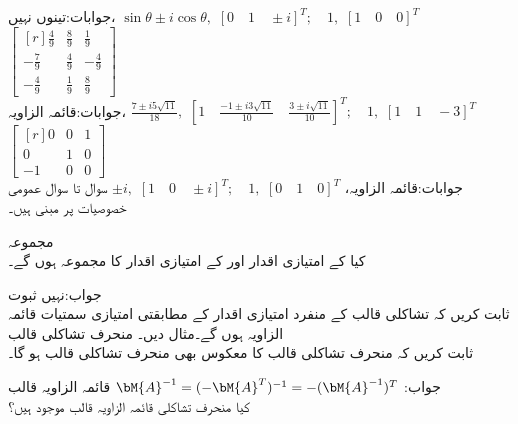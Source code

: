 جوابات:تینوں نہیں، 
$\sin \theta\pm i\cos \theta,\,\,[0\quad 1 \quad \pm i]^T;\quad  1,\,\,[1\quad 0\quad 0]^T$
\quad
$\begin{bmatrix*}[r] \tfrac{4}{9}&\tfrac{8}{9}&\tfrac{1}{9}\\-\tfrac{7}{9}&\tfrac{4}{9}&-\tfrac{4}{9}\\-\tfrac{4}{9}&\tfrac{1}{9}&\tfrac{8}{9} \end{bmatrix*}$\\
جوابات:قائمہ الزاویہ، 
$\tfrac{7\pm i5\sqrt{11}}{18},\,\,[1\quad \tfrac{-1\pm i3\sqrt{11}}{10}\quad \tfrac{3\pm i\sqrt{11}}{10}]^T;\quad  1,\,\,[1\quad 1\quad -3]^T$
\quad
$\begin{bmatrix*}[r] 0&0&1\\0&1&0\\ -1&0&0\end{bmatrix*}$\\
جوابات:قائمہ الزاویہ، 
$\pm i,\,\,[1\quad 0 \quad \pm i]^T;\quad  1,\,\,[0\quad 1\quad 0]^T$
سوال  تا سوال  عمومی خصوصیات پر مبنی ہیں۔

\quad مجموعہ\\
کیا  کے امتیازی اقدار  اور  کے امتیازی اقدار کا مجموعہ ہوں گے۔

جواب:نہیں
\quad ثبوت\\
ثابت کریں کہ تشاکلی قالب کے منفرد امتیازی اقدار کے مطابقتی امتیازی سمتیات قائمہ الزاویہ ہوں گے۔مثال دیں۔
\quad منحرف تشاکلی قالب\\
ثابت کریں کہ منحرف تشاکلی قالب کا معکوس بھی منحرف تشاکلی قالب ہو گا۔

جواب:
$\bM{A}^{-1}=(-\bM{A}^T)^{-1}=-(\bM{A}^{-1})^T$
\quad قائمہ الزاویہ قالب\\
کیا  منحرف تشاکلی قائمہ الزاویہ قالب موجود ہیں؟

